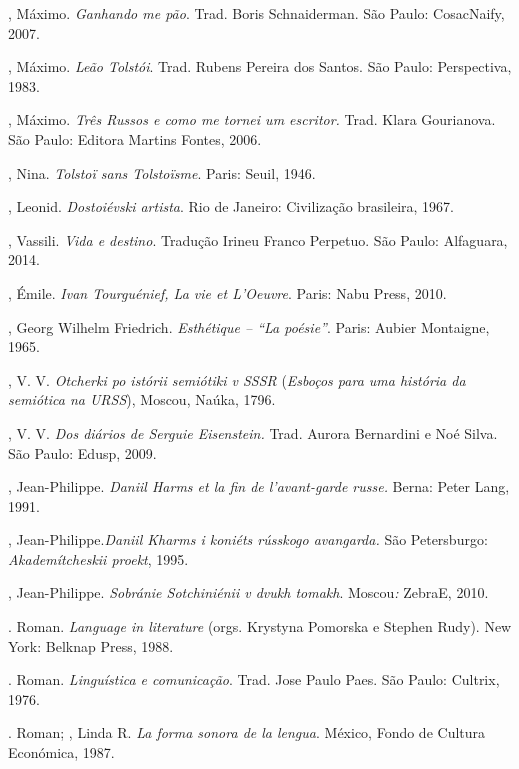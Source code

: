 , Máximo. \emph{Ganhando me pão}. Trad. Boris Schnaiderman. São Paulo: CosacNaify, 2007.

, Máximo. \emph{Leão Tolstói}. Trad. Rubens Pereira dos Santos. São Paulo: Perspectiva, 1983.

, Máximo. \emph{Três Russos e como me tornei um escritor.} Trad. Klara Gourianova. São Paulo: Editora Martins Fontes, 2006.

, Nina. \emph{Tolstoï sans Tolstoïsme}. Paris: Seuil, 1946.

, Leonid. \emph{Dostoiévski artista}. Rio de Janeiro: Civilização brasileira, 1967.

, Vassili. \emph{Vida e destino}. Tradução Irineu Franco Perpetuo. São Paulo: Alfaguara, 2014.

, Émile. \emph{Ivan Tourguénief, La vie et L'Oeuvre}. Paris: Nabu
Press, 2010.

, Georg Wilhelm Friedrich. \emph{Esthétique -- ``La
poésie''}. Paris: Aubier Montaigne, 1965.

, V. V. \emph{Otcherki po istórii semiótiki v SSSR} (\emph{Esboços
para uma história da semiótica na URSS}), Moscou, Naúka, 1796.

, V. V. \emph{Dos diários de Serguie Eisenstein.} Trad. Aurora
Bernardini e Noé Silva. São Paulo: Edusp, 2009.

, Jean-Philippe. \emph{Daniil Harms et la fin de l'avant-garde
russe.} Berna: Peter Lang, 1991.

, Jean-Philippe.\emph{Daniil Kharms i koniéts rússkogo
avangarda.} São Petersburgo: \emph{Akademítcheskii proekt}, 1995.

, Jean-Philippe. \emph{Sobránie Sotchiniénii v dvukh tomakh}.
Moscou\emph{:} ZebraE, 2010.

. Roman. \emph{Language in literature} (orgs. Krystyna Pomorska
e Stephen Rudy). New York: Belknap Press, 1988.

. Roman. \emph{Linguística e comunicação}. Trad. Jose Paulo
Paes. São Paulo: Cultrix, 1976.

. Roman; , Linda R. \emph{La forma sonora de la lengua}.
México, Fondo de Cultura Económica, 1987.

